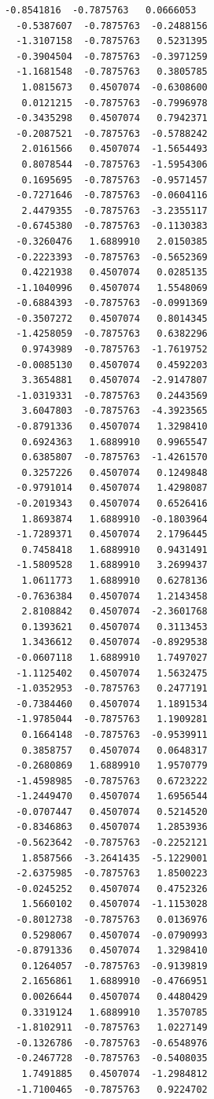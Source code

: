 \documentclass[11pt]{article}
\begin{document}
\begin{Verbatim}[commandchars=\\\{\}]
  -0.8541816  -0.7875763   0.0666053
  -0.5387607  -0.7875763  -0.2488156
  -1.3107158  -0.7875763   0.5231395
  -0.3904504  -0.7875763  -0.3971259
  -1.1681548  -0.7875763   0.3805785
   1.0815673   0.4507074  -0.6308600
   0.0121215  -0.7875763  -0.7996978
  -0.3435298   0.4507074   0.7942371
  -0.2087521  -0.7875763  -0.5788242
   2.0161566   0.4507074  -1.5654493
   0.8078544  -0.7875763  -1.5954306
   0.1695695  -0.7875763  -0.9571457
  -0.7271646  -0.7875763  -0.0604116
   2.4479355  -0.7875763  -3.2355117
  -0.6745380  -0.7875763  -0.1130383
  -0.3260476   1.6889910   2.0150385
  -0.2223393  -0.7875763  -0.5652369
   0.4221938   0.4507074   0.0285135
  -1.1040996   0.4507074   1.5548069
  -0.6884393  -0.7875763  -0.0991369
  -0.3507272   0.4507074   0.8014345
  -1.4258059  -0.7875763   0.6382296
   0.9743989  -0.7875763  -1.7619752
  -0.0085130   0.4507074   0.4592203
   3.3654881   0.4507074  -2.9147807
  -1.0319331  -0.7875763   0.2443569
   3.6047803  -0.7875763  -4.3923565
  -0.8791336   0.4507074   1.3298410
   0.6924363   1.6889910   0.9965547
   0.6385807  -0.7875763  -1.4261570
   0.3257226   0.4507074   0.1249848
  -0.9791014   0.4507074   1.4298087
  -0.2019343   0.4507074   0.6526416
   1.8693874   1.6889910  -0.1803964
  -1.7289371   0.4507074   2.1796445
   0.7458418   1.6889910   0.9431491
  -1.5809528   1.6889910   3.2699437
   1.0611773   1.6889910   0.6278136
  -0.7636384   0.4507074   1.2143458
   2.8108842   0.4507074  -2.3601768
   0.1393621   0.4507074   0.3113453
   1.3436612   0.4507074  -0.8929538
  -0.0607118   1.6889910   1.7497027
  -1.1125402   0.4507074   1.5632475
  -1.0352953  -0.7875763   0.2477191
  -0.7384460   0.4507074   1.1891534
  -1.9785044  -0.7875763   1.1909281
   0.1664148  -0.7875763  -0.9539911
   0.3858757   0.4507074   0.0648317
  -0.2680869   1.6889910   1.9570779
  -1.4598985  -0.7875763   0.6723222
  -1.2449470   0.4507074   1.6956544
  -0.0707447   0.4507074   0.5214520
  -0.8346863   0.4507074   1.2853936
  -0.5623642  -0.7875763  -0.2252121
   1.8587566  -3.2641435  -5.1229001
  -2.6375985  -0.7875763   1.8500223
  -0.0245252   0.4507074   0.4752326
   1.5660102   0.4507074  -1.1153028
  -0.8012738  -0.7875763   0.0136976
   0.5298067   0.4507074  -0.0790993
  -0.8791336   0.4507074   1.3298410
   0.1264057  -0.7875763  -0.9139819
   2.1656861   1.6889910  -0.4766951
   0.0026644   0.4507074   0.4480429
   0.3319124   1.6889910   1.3570785
  -1.8102911  -0.7875763   1.0227149
  -0.1326786  -0.7875763  -0.6548976
  -0.2467728  -0.7875763  -0.5408035
   1.7491885   0.4507074  -1.2984812
  -1.7100465  -0.7875763   0.9224702

\end{Verbatim}
\end{document}
